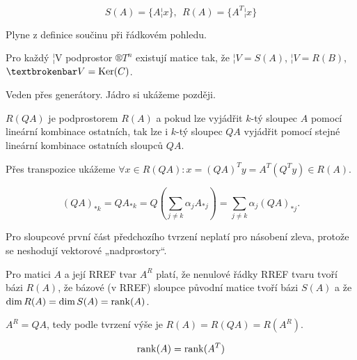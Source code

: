 \documentclass[12pt]{article}					%
\begin{document}
    \begin{tvrzeni}
        $$ S(A) = \{A¦x\},\ \ R(A) = \{A^T¦x\} $$ 
        \begin{dukazin}
            Plyne z definice součinu při řádkovém pohledu.
        \end{dukazin}
    \end{tvrzeni}

    \begin{tvrzeni}
        Pro každý ¦V podprostor $®T^n$ existují matice tak, že $¦V = S(A)$, $¦V = R(B)$, $¦V = \Ker(C)$.
        \begin{dukazin}
            Veden přes generátory. Jádro si ukážeme později.
        \end{dukazin}
    \end{tvrzeni}

    \begin{tvrzeni}
        $R(QA)$ je podprostorem $R(A)$ a pokud lze vyjádřit $k$-tý sloupec $A$ pomocí lineární kombinace ostatních, tak lze i $k$-tý sloupec $QA$ vyjádřit pomocí stejné lineární kombinace ostatních sloupců $QA$.
        \begin{dukazin}
            Přes transpozice ukážeme $\forall x \in R(QA): x = (QA)^Ty = A^T(Q^Ty) \in R(A)$. 

            $$ (QA)_{*k} = QA_{*k} = Q(\sum_{j≠k}\alpha_jA_{*j}) = \sum_{j≠k}\alpha_j (QA)_{*j}. $$ 
        \end{dukazin}
    \end{tvrzeni}

    \begin{upozorneni}
        Pro sloupcové první část předchozího tvrzení neplatí pro násobení zleva, protože se neshodují vektorové „nadprostory“.
    \end{upozorneni}

    \begin{veta}
        Pro matici $A$ a její RREF tvar $A^R$ platí, že nenulové řádky RREF tvaru tvoří bázi $R(A)$, že bázové (v RREF) sloupce původní matice tvoří bázi $S(A)$ a že $\dim R(A) = \dim S(A) = \operatorname{rank}(A)$.

        \begin{dukazin}
            $A^R = QA$, tedy podle tvrzení výše je $R(A) = R(QA) = R(A^R)$. 
        \end{dukazin}
    \end{veta}

    \begin{dusledek}
        $$ \operatorname{rank}(A) = \operatorname{rank}(A^T) $$
    \end{dusledek}
\end{document}
